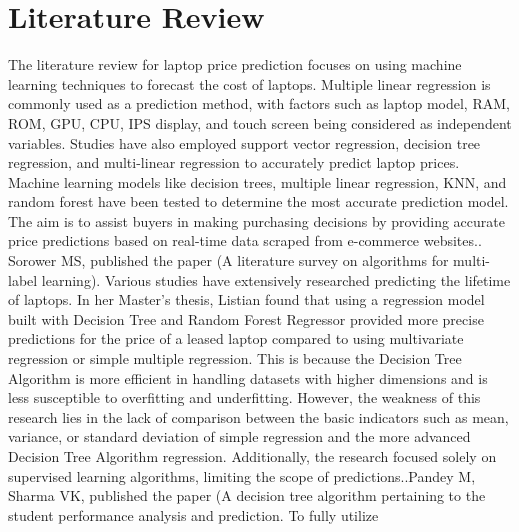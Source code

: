 \documentclass[
11pt, %
english, %
singlespacing, %
headsepline, %
]{MastersDoctoralThesis} %
\begin{document}


\tableofcontents %

\chapter{Literature Review}
The literature review for laptop price prediction focuses on using machine learning techniques to forecast the cost of laptops. Multiple linear regression is commonly used as a prediction method, with factors such as laptop model, RAM, ROM, GPU, CPU, IPS display, and touch screen being considered as independent variables. Studies have also employed support vector regression, decision tree regression, and multi-linear regression to accurately predict laptop prices. Machine learning models like decision trees, multiple linear regression, KNN, and random forest have been tested to determine the most accurate prediction model. The aim is to assist buyers in making purchasing decisions by providing accurate price predictions based on real-time data scraped from e-commerce websites.\hfill\break\break
[1]. Sorower MS, published the paper (A literature survey on algorithms for multi-label learning). Various studies have extensively researched predicting 
the lifetime of laptops. In her Master's thesis, Listian found that using a regression model built with Decision Tree and Random Forest Regressor provided 
more precise predictions for the price of a leased laptop compared to using multivariate regression or simple multiple regression. This is because the 
Decision Tree Algorithm is more efficient in handling datasets with higher dimensions and is less susceptible to overfitting and underfitting. However, 
the weakness of this research lies in the lack of comparison between the basic indicators such as mean, variance, or standard deviation of simple regression 
and the more advanced Decision Tree Algorithm regression. Additionally, the research focused solely on supervised learning algorithms, limiting the scope of predictions.\hfill\break\break
[2].Pandey M, Sharma VK, published the paper (A decision tree algorithm pertaining to the student performance analysis and prediction. To fully utilize 
\end{document}
